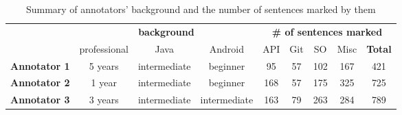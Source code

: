 \begin{table}[H]
\centering    
\caption{Summary of annotators' background and the number of sentences marked by them}
\label{tbl:corpus-summary-per-annotator}
\begin{scriptsize}
\begin{threeparttable}
\begin{tabular}{lcccccccc}




& \multicolumn{3}{c}{\textbf{background}}
& \multicolumn{5}{c}{\textbf{\# of sentences marked}}
\\ \cmidrule(l){2-4} \cmidrule(l){5-9} 



& professional & Java & Android
& API & Git & SO & Misc & \textbf{Total} 
\\

\hline


\textbf{Annotator 1}
& 5 years & intermediate & beginner
& 95 & 57 & 102 & 167 & 421 \\




\textbf{Annotator 2}
& 1 year & intermediate & beginner
& 168 & 57 & 175 & 325 & 725 \\




\textbf{Annotator 3}
& 3 years & intermediate & intermediate
& 163 & 79 & 263 & 284 & 789 \\

\hline



\end{tabular}
\end{threeparttable}
\end{scriptsize}
\end{table}

